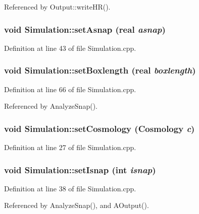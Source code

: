 Referenced by Output::writeHR().

\subsubsection[{setAsnap}]{\setlength{\rightskip}{0pt plus 5cm}void Simulation::setAsnap ({\bf real} {\em asnap})}\label{classSimulation_a371b8a6dd17e18ed451172dc0b0229c1}


Definition at line 43 of file Simulation.cpp.

\subsubsection[{setBoxlength}]{\setlength{\rightskip}{0pt plus 5cm}void Simulation::setBoxlength ({\bf real} {\em boxlength})}\label{classSimulation_a40a299a42e925403ef5f3ee91421648d}


Definition at line 66 of file Simulation.cpp.



Referenced by AnalyzeSnap().

\subsubsection[{setCosmology}]{\setlength{\rightskip}{0pt plus 5cm}void Simulation::setCosmology ({\bf Cosmology} {\em c})}\label{classSimulation_a79be25490771dcf373cce8760d2e6e72}


Definition at line 27 of file Simulation.cpp.

\subsubsection[{setIsnap}]{\setlength{\rightskip}{0pt plus 5cm}void Simulation::setIsnap (int {\em isnap})}\label{classSimulation_a76edc37c249af029304892640ca1b9f7}


Definition at line 38 of file Simulation.cpp.



Referenced by AnalyzeSnap(), and AOutput().

